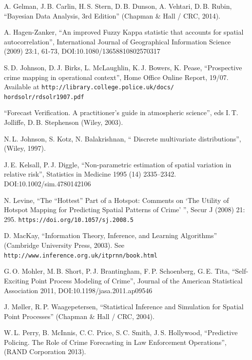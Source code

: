 \documentclass[twoside,a4paper,twocolumn,10pt]{article}
\theoremstyle{plain}
\theoremstyle{definition}
\begin{document}
\begin{thebibliography}{99}
 A. Gelman, J.\,B. Carlin, H.\,S. Stern, D.\,B. Dunson, A. Vehtari,
   D.\,B. Rubin,
	``Bayesian Data Analysis, 3rd Edition''
	(Chapman \& Hall / CRC, 2014).

 A. Hagen-Zanker, ``An improved Fuzzy Kappa statistic that accounts
for spatial autocorrelation'',
        International Journal of Geographical Information Science (2009)
        23:1, 61-73, DOI:10.1080/13658810802570317

 S.\,D. Johnson, D.\,J. Birks, L. McLaughlin, K.\,J. Bowers, K. Pease,
	``Prospective crime mapping in operational context'', Home Office Online Report, 19/07.
	Available at \texttt{http://library.college.police.uk/docs/}\\\texttt{hordsolr/rdsolr1907.pdf}

 ``Forecast Verification.  A practitioner's guide in atmospheric science'',
    eds I.\,T. Jolliffe, D.\,B. Stephenson (Wiley, 2003).

 N.\,L. Johnson, S. Kotz, N. Balakrishnan,
   `` 	Discrete multivariate distributions'',
   (Wiley, 1997).

 J.\,E. Kelsall, P.\,J. Diggle,
	``Non-parametric estimation of spatial variation in relative risk'',
	Statistics in Medicine 1995 (14) 2335--2342.  DOI:10.1002/sim.4780142106

 N. Levine, ``The ``Hottest'' Part of a Hotspot: Comments on `The Utility of Hotspot Mapping for Predicting Spatial Patterns of Crime' '',
	Secur J (2008) 21: 295. \texttt{https://doi.org/10.1057/sj.2008.5}

 D. MacKay, ``Information Theory, Inference, and Learning Algorithms''
	(Cambridge University Press, 2003).  See \texttt{http://www.inference.org.uk/itprnn/book.html}
	
 G.\,O. Mohler, M.\,B. Short, P.\,J. Brantingham, F.\,P. Schoenberg, G.\,E. Tita,
	``Self-Exciting Point Process Modeling of Crime'',
	Journal of the American Statistical Association 2011, DOI:10.1198/jasa.2011.ap09546

 J. M{\o}ller, R.\,P. Waagepetersen,
        ``Statistical Inference and Simulation for Spatial Point Processes''
        (Chapman \& Hall / CRC, 2004).

 W.\,L. Perry, B. McInnis, C.\,C. Price, S.\,C. Smith, J.\,S. Hollywood,
        ``Predictive Policing. The Role of Crime Forecasting in Law Enforcement Operations'',
        (RAND Corporation 2013).


\end{thebibliography}
\end{document}
